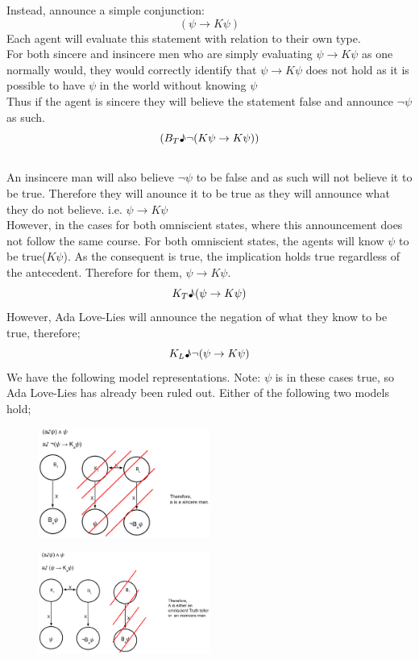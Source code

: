 \documentclass[12pt, titlepage, twoside, a4paper]{report}
\begin{document}
Instead, announce a simple conjunction:
$$(\psi \to K\psi)$$ 
Each agent will evaluate this statement with relation to their own type.\\
For both sincere and insincere men who are simply evaluating $\psi \to K\psi$ as one normally would, they would correctly identify that $\psi \to K\psi$ does not hold as it is possible to have $\psi$ in the world without knowing $\psi$\\
Thus if the agent is sincere they will believe the statement false and announce $\neg \psi$ as such. 
$$(B_T \text{\textmusicalnote} \neg (K \psi \to K \psi))$$ \\
An insincere man will also believe $\neg \psi$ to be false and as such will not believe it to be true. Therefore they will anounce it to be true as they will announce what they do not believe. i.e. $\psi \to K\psi$\\
However, in the cases for both omniscient states, where this announcement does not follow the same course. For both omniscient states, the agents will know $\psi$ to be true($K\psi$). As the consequent is true, the implication holds true regardless of the antecedent. Therefore for them, $\psi \to K\psi$.
$$K_T\text{\textmusicalnote} (\psi \to K\psi)$$
However, Ada Love-Lies will announce the negation of what they know to be true, therefore;
$$K_L\text{\textmusicalnote} \neg (\psi \to K\psi)$$
We have the following model representations. Note: $\psi$ is in these cases true, so Ada Love-Lies has already been ruled out. Either of the following two models hold; 
\begin{figure}[h!]
  \centering
  \includegraphics[width=0.5\textwidth]{slide43.eps}
\end{figure}
\begin{figure}[h!]
  \centering
  \includegraphics[width=0.5\textwidth]{slide44.eps}
\end{figure}
\end{document}
